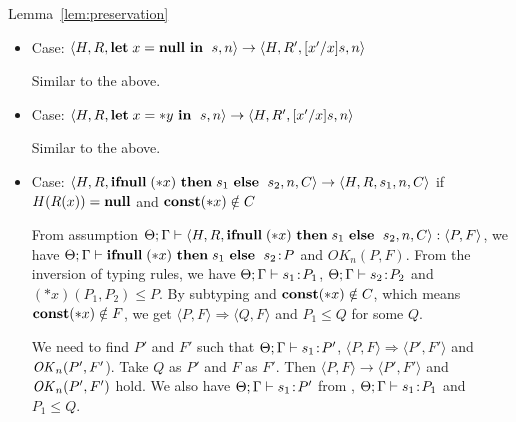 \begin{pfof}{Lemma~\ref{lem:preservation}}
\begin{itemize}
  We need to find \(P'\) and \(F'\) such that \(\Theta; \Gamma,x',y
  \vdash [x'/x]s : P'\) , \( \langle P, F \rangle \rightarrow \langle
  P', F' \rangle\) and \(\OK_n(P', F'\)). Take \(Q\) as \(P'\) and
  \(F\) as \(F'\). Then \( \langle P,F \rangle \Longrightarrow \langle
  P', F' \rangle\) and \(\OK_n(P', F')\) hold. From \(\Theta; \Gamma,
  x,y \vdash s\COL P''\) and \( \LET x = y\; \IN P'' \le P\), we have
  \(\Theta; \Gamma, x'',y \vdash [x''/x]s : [x''/x]P''\) and \( \LET
  x'' = y\; \IN [x''/x]P'' \le P\), and then by subtying we have
  \([x''/x]P'' \le Q'\) for some \(Q'\). Therefore, we have \(\Theta;
  \Gamma, x'',y \vdash [x''/x]s : Q'\). Take \(x''\) as \(x'\) and
  \(Q'\) as \(P'\), then \(\Theta; \Gamma,x',y \vdash [x'/x]s : P'\)
  holds.
  
\item Case: \( \langle H, R, \LET x = \NULL \ \IN \ s, n\rangle
  \rightarrow \langle H, R', [x'/x]s, n \rangle \)

  Similar to the above.

\item Case: \( \langle H, R, \mathbf{let}\; x = *y \ \mathbf{in}\; \ s, n\rangle
  \rightarrow \langle H, R', [x'/x]s, n\rangle \)

  Similar to the above.

\item Case: \(\langle H, R, \IFNULL \Sirx \ \THEN s_{1} \ \ELSE
  \ s_{2}, n, C\rangle \rightarrow \langle H, R, s_{1}, n, C \rangle\)
  if \(H(R(x)) = \mathbf{null}\) and \(\mathbf{const}(*x) \notin C\)

  From assumption \( \Theta; \Gamma \vdash \langle H, R, \mathbf{ifnull}\;(*x)
  \ \mathbf{then}\; s_{1} \ \mathbf{else}\; \ s_{2}, n, C \rangle : \langle P, F
  \rangle\), we have \(\Theta; \Gamma \vdash \mathbf{ifnull}\;(*x) \ \mathbf{then}\;
  s_{1} \ \mathbf{else}\; \ s_{2} \!:\! P \) and \(OK_n(P, F)\). From the
  inversion of typing rules, we have \(\Theta; \Gamma \vdash s_{1}
  \!:\! P_1\), \(\Theta; \Gamma \vdash s_{2} \!:\! P_2\) and \((*x)(P_1,
  P_2) \le P\). By subtyping and \(\mathbf{const}(*x) \notin C\), which means
  \(\mathbf{const}(*x) \notin F\), we get \(\langle P, F \rangle \Longrightarrow
  \langle Q, F \rangle \) and \(P_1 \le Q\) for some \(Q\).

  We need to find \(P'\) and \(F'\) such that \(\Theta;\Gamma \vdash
  s_1\!:\! P'\), \( \langle P, F \rangle \Longrightarrow \langle P', F'
  \rangle\) and \(\OK_n(P', F'\)). Take \(Q\) as \(P'\) and \(F\) as
  \(F'\). Then \( \langle P,F \rangle \rightarrow \langle P', F'
  \rangle\) and \(\OK_n(P', F')\) hold.  We also have \(\Theta; \Gamma
  \vdash s_1 \!:\! P'\) from , \(\Theta; \Gamma \vdash s_1
  \!:\! P_1\) and \( P_1 \le Q\).


\end{itemize}
\end{pfof}
